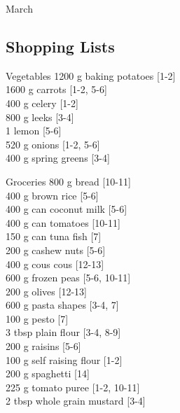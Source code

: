 \begin{menu}{March}
    \subsection*{Shopping Lists}
      \begin{shoppinglist}{Vegetables}
      1200 g baking potatoes {\scriptsize[1-2]}\\
      1600 g carrots {\scriptsize[1-2, 5-6]}\\
      400 g celery {\scriptsize[1-2]}\\
      800 g leeks {\scriptsize[3-4]}\\
      1  lemon {\scriptsize[5-6]}\\
      520 g onions {\scriptsize[1-2, 5-6]}\\
      400 g spring greens {\scriptsize[3-4]}\\
      \end{shoppinglist}%
      \begin{shoppinglist}{Groceries}
      800 g bread {\scriptsize[10-11]}\\
      400 g brown rice {\scriptsize[5-6]}\\
      400 g can coconut milk {\scriptsize[5-6]}\\
      400 g can tomatoes {\scriptsize[10-11]}\\
      150 g can tuna fish {\scriptsize[7]}\\
      200 g cashew nuts {\scriptsize[5-6]}\\
      400 g cous cous {\scriptsize[12-13]}\\
      600 g frozen peas {\scriptsize[5-6, 10-11]}\\
      200 g olives {\scriptsize[12-13]}\\
      600 g pasta shapes {\scriptsize[3-4, 7]}\\
      100 g pesto {\scriptsize[7]}\\
      3 tbsp plain flour {\scriptsize[3-4, 8-9]}\\
      200 g raisins {\scriptsize[5-6]}\\
      100 g self raising flour {\scriptsize[1-2]}\\
      200 g spaghetti {\scriptsize[14]}\\
      225 g tomato puree {\scriptsize[1-2, 10-11]}\\
      2 tbsp whole grain mustard {\scriptsize[3-4]}\\
      \end{shoppinglist}%
      \par\vfil %

\end{menu}

